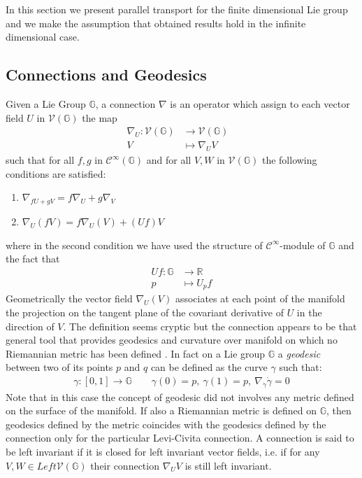 In this section we present parallel transport for the finite dimensional Lie group and we make the assumption that obtained results hold in the infinite dimensional case.




\subsection{Connections and Geodesics}

Given a Lie Group $\mathbb{G}$, a connection $\nabla$ is an operator which assign to each vector field $U$ in $\mathcal{V}(\mathbb{G})$ the map
\begin{align*}
\nabla_{U} : \mathcal{V}(\mathbb{G}) & \longrightarrow  \mathcal{V}(\mathbb{G}) &   \\
V &\longmapsto  \nabla_{U}V
\end{align*}
such that for all $f,g$ in $\mathcal{C}^{\infty}(\mathbb{G})$ and for all $V,W$ in $\mathcal{V}(\mathbb{G})$ the following conditions are satisfied:
\begin{enumerate}
	\item $ \nabla_{fU + gV} = f\nabla_{U} + g\nabla_{V}$
	\item $\nabla_{U}(fV) = f \nabla_{U}(V) + (Uf)V $
\end{enumerate}
where in the second condition we have used the structure of  $\mathcal{C}^{\infty}$-module of $\mathbb{G}$ and the fact that 
\begin{align*}
Uf: \mathbb{G} & \longrightarrow  \mathbb{R}    \\
p &\longmapsto  U_{p}f
\end{align*}
Geometrically the vector field $\nabla_{U}(V)$ associates at each point of the manifold the projection on the tangent plane of the covariant derivative of $U$ in the direction of $V$. The definition seems cryptic but the connection appears to be that general tool that provides geodesics and curvature over manifold on which no Riemannian metric has been defined \cite{do1992riemannian}.
In fact on a Lie group $\mathbb{G}$ a \emph{geodesic} between two of its points $p$ and $q$ can be defined as the curve $\gamma$ such that:
\begin{align*}
\gamma:[0,1] \longrightarrow \mathbb{G} \qquad \gamma(0)=p,~ \gamma(1) = p,~ \nabla_{\dot{\gamma}}\dot{\gamma} = 0 
\end{align*} 
Note that in this case the concept of geodesic did not involves any metric defined on the surface of the manifold. If also a Riemannian metric is defined on $\mathbb{G} $, then geodesics defined by the metric coincides with the geodesics defined by the connection only for the particular Levi-Civita connection.
A connection is said to be left invariant if it is closed for left invariant vector fields, i.e. if for any $V, W \in Left\mathcal{V}(\mathbb{G}) $ their connection $ \nabla_{U}V$ is still left invariant.

